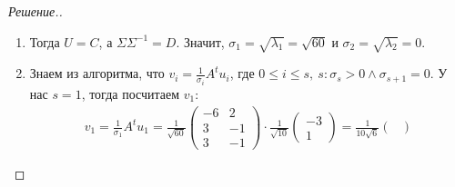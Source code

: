 \documentclass[a4paper]{article}
\theoremstyle{remark}
\newcommand{\arrtw}[2]{%
  \ensuremath{\xrightarrow{\text{Э}_2(#1,\; #2)}}%
}
\newcommand{\arrth}[2]{%
  \ensuremath{\xrightarrow{\text{Э}_3(#1,\; #2)}}%
}
\begin{document}
\begin{proof}[Решение.]
\begin{enumerate}
\begin{itemize}
\begin{align*}
\begin{pmatrix}
                  0 & 0 \\
                  -18 & 6
                \end{pmatrix} \arrtw{1}{2} \begin{pmatrix}
                  -18 & 6 \\
                  0 & 0
                \end{pmatrix} \arrth{1}{-\nicefrac{1}{3}} \begin{pmatrix}
                  3 & -1 \\
                  0 & 0
                \end{pmatrix}
              \end{align*}
              Тогда ФСР~--- один вектор $\begin{pmatrix}
                1 & 3
              \end{pmatrix}$. Нормируем и получим вектор $\frac{1}{\sqrt{10}}\begin{pmatrix}
                1 & 3
              \end{pmatrix}$.
            \end{itemize}
            Тогда матрица $C$ выглядит так:
            \begin{equation*}
              C = \frac{1}{\sqrt{10}} \begin{pmatrix}
                -3 & 1 \\
                1 & 3
              \end{pmatrix}.
            \end{equation*}
            \item Тогда $U = C$, а $\Sigma\Sigma^{-1} = D$. Значит, $\sigma_1 = \sqrt{\lambda_1} = \sqrt{60}$ и $\sigma_2 = \sqrt{\lambda_2} = 0$.
            \item Знаем из алгоритма, что $v_i = \frac{1}{\sigma_i}A^t u_i$, где $0 \leq i \leq s,\ s: \sigma_s > 0 \wedge \sigma_{s+1} = 0$. У нас $s = 1$, тогда посчитаем $v_1$:
            \begin{align*}
              v_1 = \frac{1}{\sigma_1} A^t u_1 = \frac{1}{\sqrt{60}} \begin{pmatrix}
                -6 & 2 \\
                3 & -1 \\
                3 & -1      
              \end{pmatrix} \cdot \frac{1}{\sqrt{10}} \begin{pmatrix}
                -3 \\
                1
              \end{pmatrix} = \frac{1}{10\sqrt{6}} \begin{pmatrix}

\end{pmatrix}
\end{align*}
\end{enumerate}
\end{proof}
\end{document}

